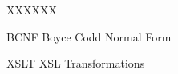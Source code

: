 
\begin{listofabbrv}{XXXXXX}
  \item [BCNF] Boyce Codd Normal Form
  \item [XSLT] XSL Transformations
\end{listofabbrv}

